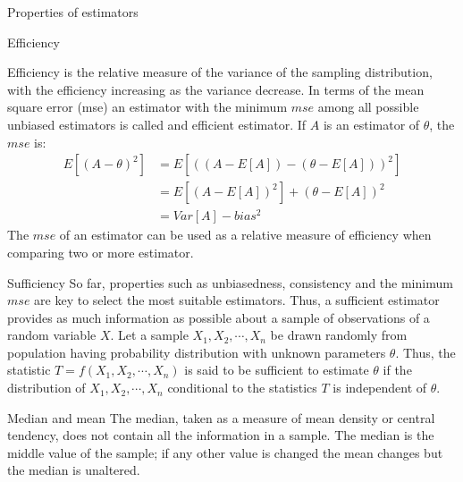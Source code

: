 \documentclass[8pt]{beamer}
\renewcommand{\emph}[1]{\textcolor{myorange}{#1}}
\begin{document}
\begin{frame}{Properties of estimators}
\begin{block}{Efficiency}

    \vspace{-5pt}
    \alert{Efficiency} is the relative measure of the variance of the sampling distribution, with the efficiency increasing as the variance decrease. In terms of the \emph{mean square error (mse)} an estimator with the minimum $mse$ among all possible unbiased estimators is called and \alert{efficient estimator}. If $A$ is an estimator of $\theta$, the $mse$ is:
    \begin{align*}
        E\left[(A-\theta)^2\right] &= E\left[ \left( \left(A - E[A] \right) - \left( \theta - E[A] \right) \right)^2 \right]  \\
                                                                                                                                  &= E[ (A - E[A])^2 ] + (\theta - E[A])^2 \\
                                                                                                                                  &= Var[A] - bias^2
    \end{align*}
    The $mse$ of an estimator can be used as a relative measure of efficiency when comparing two or more estimator. 
    \end{block}

    \vspace{-7pt}
\begin{block}{Sufficiency}
    So far, properties such as unbiasedness, consistency and the minimum $mse$ are key to select the most suitable estimators. Thus, a \alert{sufficient estimator} provides as much information as possible about a sample of observations of a random variable $X$. Let a sample $X_1, X_2, \cdots, X_n$ be drawn randomly from population having probability distribution with unknown parameters $\theta$. Thus, the statistic $T = f(X_1, X_2, \cdots, X_n)$ is said to be sufficient to estimate $\theta$ if the distribution of $X_1, X_2, \cdots, X_n$ conditional to the statistics $T$ is independent of $\theta$.    
    \end{block}
    \vspace{-9pt}
    \begin{exampleblock}{Median and mean}
        The \emph{median}, taken as a measure of mean density or central tendency, does not contain all the information in a sample. The median is the middle value of the sample; if any other value is changed the mean changes but the median is unaltered.
    \end{exampleblock}

\end{frame}
\end{document}
